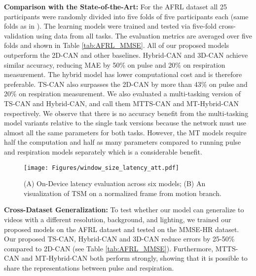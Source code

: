 \documentclass{article}
\begin{document}
\textbf{Comparison with the State-of-the-Art:}
For the AFRL dataset all 25 participants were randomly divided into five folds of five participants each (same folds as in \cite{chen2018deepphys}). The learning models were trained and tested via five-fold cross-validation using data from all tasks. The evaluation metrics are averaged over five folds and shown in Table \ref{tab:AFRL_MMSE}. All of our proposed models outperform the 2D-CAN and other baselines. Hybrid-CAN and 3D-CAN achieve similar accuracy, reducing MAE by 50\% on pulse and 20\% on respiration measurement. The hybrid model has lower computational cost and is therefore preferable. TS-CAN also surpasses the 2D-CAN by more than 43\% on pulse and 20\% on respiration measurement. We also evaluated a multi-tasking version of TS-CAN and Hybrid-CAN, and call them MTTS-CAN and MT-Hybrid-CAN respectively. We observe that there is no accuracy benefit from the multi-tasking model variants relative to the single task versions because the network must use almost all the same parameters for both tasks. However, the MT models require half the computation and half as many parameters compared to running pulse and respiration models separately which is a considerable benefit.
\begin{wrapfigure}{L}{0.5\textwidth}
\centering
\texttt{[image: Figures/window\_size\_latency\_att.pdf]}
\caption{(A) On-Device latency evaluation across six models; (B) An visualization of TSM on a normalized frame from motion branch.}
\label{fig:window_size_latency}
\end{wrapfigure}

\textbf{Cross-Dataset Generalization:}
To test whether our model can generalize to videos with a different resolution, background, and lighting, we trained our proposed models on the AFRL dataset and tested on the MMSE-HR dataset. Our proposed TS-CAN, Hybrid-CAN and 3D-CAN reduce errors by 25-50\% compared to 2D-CAN (see Table \ref{tab:AFRL_MMSE}). Furthermore, MTTS-CAN and MT-Hybrid-CAN both perform strongly, showing that it is possible to share the representations between pulse and respiration.
\end{document}
